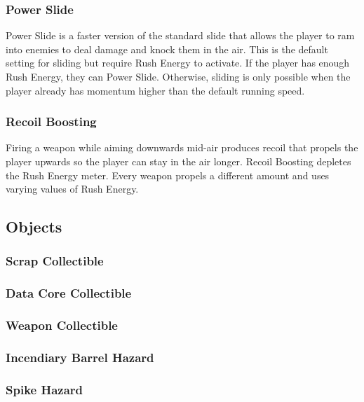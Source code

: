 \documentclass[12pt]{article}
\begin{document}
\subsubsection{Power Slide}

Power Slide is a faster version of the standard slide that allows the player to ram into enemies to deal damage and knock them in the air. This is the default setting for sliding but require Rush Energy to activate. If the player has enough Rush Energy, they can Power Slide. Otherwise, sliding is only possible when the player already has momentum higher than the default running speed. 

\subsubsection{Recoil Boosting}

Firing a weapon while aiming downwards mid-air produces recoil that propels the player upwards so the player can stay in the air longer. Recoil Boosting depletes the Rush Energy meter. Every weapon propels a different amount and uses varying values of Rush Energy. 

\subsection{Objects}

\subsubsection{Scrap Collectible}

\subsubsection{Data Core Collectible}

\subsubsection{Weapon Collectible}

\subsubsection{Incendiary Barrel Hazard}

\subsubsection{Spike Hazard}
\end{document}
